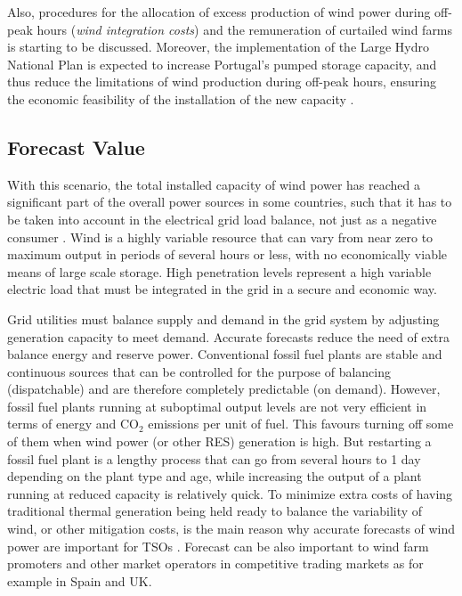 Also, procedures for the allocation of excess production of wind power during off-peak hours (\textit{wind integration costs}) and the remuneration of curtailed wind farms is starting to be discussed. Moreover, the implementation of the Large Hydro National Plan is expected to increase Portugal's pumped storage capacity, and thus reduce the limitations of wind production during off-peak hours, ensuring the economic feasibility of the installation of the new capacity \citep{GWEC2010out}.

\subsection{Forecast Value}

With this scenario, the total installed capacity of wind power has reached a significant part of the overall power sources in some countries, such that it has to be taken into account in the electrical grid load balance, not just as a negative consumer \citep{Riso1997}. Wind is a highly variable resource that can vary from near zero to maximum output in periods of several hours or less, with no economically viable means of large scale storage. High penetration levels represent a high variable electric load that must be integrated in the grid in a secure and economic way.

Grid utilities must balance supply and demand in the grid system by adjusting generation capacity to meet demand. Accurate forecasts reduce the need of extra balance energy and reserve power. Conventional fossil fuel plants are stable and continuous sources that can be controlled for the purpose of balancing (dispatchable) and are therefore completely predictable (on demand). However, fossil fuel plants running at suboptimal output levels are not very efficient in terms of energy and $\mathrm{CO_2}$ emissions per unit of fuel. This favours turning off some of them when wind power (or other RES) generation is high. But restarting a fossil fuel plant is a lengthy process that can go from several hours to 1 day depending on the plant type and age, while increasing the output of a plant running at reduced capacity is relatively quick. To minimize extra costs of having traditional thermal generation being held ready to balance the variability of wind, or other mitigation costs, is the main reason why accurate forecasts of wind power are important for TSOs \citep{Marquis2011}. Forecast can be also important to wind farm promoters and other market operators in competitive trading markets as for example in Spain and UK.

